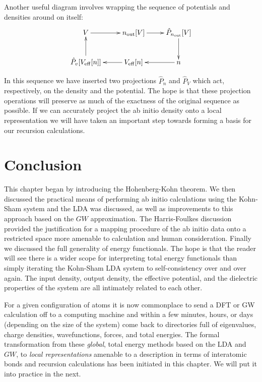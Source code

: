 Another useful diagram involves wrapping the sequence of potentials and densities around on itself:
%
\[\xymatrix{
	V \ar[r] & n_{\rm out}[V] \ar[r] & \hat{P}_{n_{\rm out}}[V] \ar[d] \\
	\hat{P}_{v}[V_{\rm eff}[n]] \ar[u] & V_{\rm eff}[n] \ar[l] & n\ar[l] \\
}
\]

In this sequence we have inserted two 
projections $\hat{P}_{n}$ and $\hat{P}_{V}$ which act, respectively, on the density and the potential. 
The hope is that these projection operations will preserve as much of the 
exactness of the original sequence as possible. If we can accurately project the ab initio density 
onto a local representation we will have taken an important step towards forming
a basis for our recursion calculations.

\section{Conclusion}
\noindent
This chapter began by introducing the Hohenberg-Kohn theorem. 
We then discussed the practical means of performing
ab initio calculations using the Kohn-Sham system and the LDA was discussed,
as well as improvements to this approach based on the $GW$ approximation.
The Harris-Foulkes discussion provided the justification for a mapping procedure
of the ab initio data onto a restricted space more amenable to calculation
and human consideration. Finally we discussed the full generality of 
energy functionals. The hope is that the reader will see there is a wider
scope for interpreting total energy functionals than simply iterating the Kohn-Sham LDA
system to self-consistency over and over again. The input density, output density, 
the effective potential, and the dielectric properties of the system are all 
intimately related to each other.

For a given configuration of atoms it is now commonplace to send a 
DFT or GW calculation off to a computing machine and within a few minutes, hours, or 
days (depending on the size of the system) come back to directories 
full of eigenvalues, charge densities, wavefunctions, forces, and total energies.
The formal transformation from these  \textit{global}, total energy methods 
based on the LDA and $GW$, to \textit{local representations} amenable 
to a description in terms of interatomic bonds and 
recursion calculations has been initiated in this chapter. We
will put it into practice in the next.
